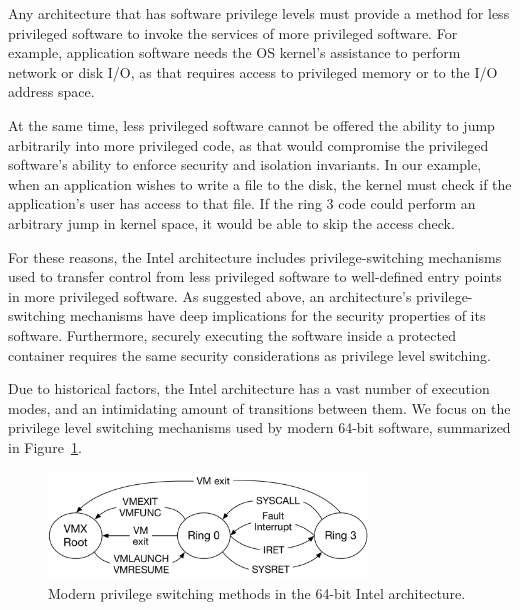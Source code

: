 \label{sec:privilege_switches}

Any architecture that has software privilege levels must provide a method for
less privileged software to invoke the services of more privileged software.
For example, application software needs the OS kernel's assistance to
perform network or disk I/O, as that requires access to privileged memory or
to the I/O address space.

At the same time, less privileged software cannot be offered the ability to
jump arbitrarily into more privileged code, as that would compromise the
privileged software's ability to enforce security and isolation invariants. In
our example, when an application wishes to write a file to the disk, the kernel
must check if the application's user has access to that file. If the ring 3
code could perform an arbitrary jump in kernel space, it would be able to skip
the access check.

For these reasons, the Intel architecture includes privilege-switching
mechanisms used to transfer control from less privileged software to
well-defined entry points in more privileged software. As suggested above, an
architecture's privilege-switching mechanisms have deep implications for the
security properties of its software. Furthermore, securely executing the
software inside a protected container requires the same security considerations
as privilege level switching.

Due to historical factors, the Intel architecture has a vast number of
execution modes, and an intimidating amount of transitions between them. We
focus on the privilege level switching mechanisms used by modern 64-bit
software, summarized in Figure~\ref{fig:cpu_ring_switch}.

\begin{figure}[hbt]
  \center
  \includegraphics[width=85mm]{figures/cpu_ring_switch.pdf}
  \caption{
    Modern privilege switching methods in the 64-bit Intel architecture.
  }
  \label{fig:cpu_ring_switch}
\end{figure}


\label{sec:syscalls}

